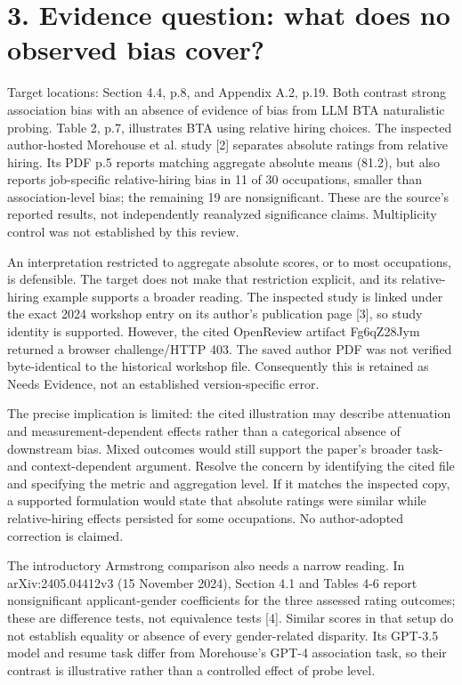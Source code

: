 \documentclass[10pt]{article}
\begin{document}
\section*{3. Evidence question: what does no observed bias cover?}
Target locations: Section 4.4, p.8, and Appendix A.2, p.19. Both contrast strong association bias with an absence of evidence of bias from LLM BTA naturalistic probing. Table 2, p.7, illustrates BTA using relative hiring choices. The inspected author-hosted Morehouse et al. study [2] separates absolute ratings from relative hiring. Its PDF p.5 reports matching aggregate absolute means (81.2), but also reports job-specific relative-hiring bias in 11 of 30 occupations, smaller than association-level bias; the remaining 19 are nonsignificant. These are the source’s reported results, not independently reanalyzed significance claims. Multiplicity control was not established by this review.\par
An interpretation restricted to aggregate absolute scores, or to most occupations, is defensible. The target does not make that restriction explicit, and its relative-hiring example supports a broader reading. The inspected study is linked under the exact 2024 workshop entry on its author’s publication page [3], so study identity is supported. However, the cited OpenReview artifact Fg6qZ28Jym returned a browser challenge/HTTP 403. The saved author PDF was not verified byte-identical to the historical workshop file. Consequently this is retained as Needs Evidence, not an established version-specific error.\par
The precise implication is limited: the cited illustration may describe attenuation and measurement-dependent effects rather than a categorical absence of downstream bias. Mixed outcomes would still support the paper’s broader task- and context-dependent argument. Resolve the concern by identifying the cited file and specifying the metric and aggregation level. If it matches the inspected copy, a supported formulation would state that absolute ratings were similar while relative-hiring effects persisted for some occupations. No author-adopted correction is claimed.\par
The introductory Armstrong comparison also needs a narrow reading. In arXiv:2405.04412v3 (15 November 2024), Section 4.1 and Tables 4-6 report nonsignificant applicant-gender coefficients for the three assessed rating outcomes; these are difference tests, not equivalence tests [4]. Similar scores in that setup do not establish equality or absence of every gender-related disparity. Its GPT-3.5 model and resume task differ from Morehouse’s GPT-4 association task, so their contrast is illustrative rather than a controlled effect of probe level.\par
\end{document}

